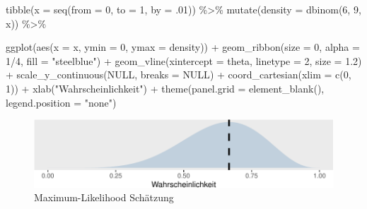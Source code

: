 \documentclass[]{tufte-handout}
\newenvironment{Shaded}{}{}
\newcommand{\AttributeTok}[1]{\textcolor[rgb]{0.49,0.56,0.16}{#1}}
\newcommand{\ConstantTok}[1]{\textcolor[rgb]{0.53,0.00,0.00}{#1}}
\newcommand{\DecValTok}[1]{\textcolor[rgb]{0.25,0.63,0.44}{#1}}
\newcommand{\FloatTok}[1]{\textcolor[rgb]{0.25,0.63,0.44}{#1}}
\newcommand{\FunctionTok}[1]{\textcolor[rgb]{0.02,0.16,0.49}{#1}}
\newcommand{\NormalTok}[1]{#1}
\newcommand{\SpecialCharTok}[1]{\textcolor[rgb]{0.25,0.44,0.63}{#1}}
\newcommand{\StringTok}[1]{\textcolor[rgb]{0.25,0.44,0.63}{#1}}
\begin{document}
\begin{Shaded}
\begin{Highlighting}[]
\FunctionTok{tibble}\NormalTok{(}\AttributeTok{x =} \FunctionTok{seq}\NormalTok{(}\AttributeTok{from =} \DecValTok{0}\NormalTok{, }\AttributeTok{to =} \DecValTok{1}\NormalTok{, }\AttributeTok{by =}\NormalTok{ .}\DecValTok{01}\NormalTok{)) }\SpecialCharTok{\%\textgreater{}\%} 
  \FunctionTok{mutate}\NormalTok{(}\AttributeTok{density =} \FunctionTok{dbinom}\NormalTok{(}\DecValTok{6}\NormalTok{, }\DecValTok{9}\NormalTok{, x)) }\SpecialCharTok{\%\textgreater{}\%} 
  
  \FunctionTok{ggplot}\NormalTok{(}\FunctionTok{aes}\NormalTok{(}\AttributeTok{x =}\NormalTok{ x, }\AttributeTok{ymin =} \DecValTok{0}\NormalTok{, }\AttributeTok{ymax =}\NormalTok{ density)) }\SpecialCharTok{+}
  \FunctionTok{geom\_ribbon}\NormalTok{(}\AttributeTok{size =} \DecValTok{0}\NormalTok{, }\AttributeTok{alpha =} \DecValTok{1}\SpecialCharTok{/}\DecValTok{4}\NormalTok{, }\AttributeTok{fill =} \StringTok{"steelblue"}\NormalTok{) }\SpecialCharTok{+}
  \FunctionTok{geom\_vline}\NormalTok{(}\AttributeTok{xintercept =}\NormalTok{ theta, }\AttributeTok{linetype =} \DecValTok{2}\NormalTok{, }\AttributeTok{size =} \FloatTok{1.2}\NormalTok{) }\SpecialCharTok{+}
  \FunctionTok{scale\_y\_continuous}\NormalTok{(}\ConstantTok{NULL}\NormalTok{, }\AttributeTok{breaks =} \ConstantTok{NULL}\NormalTok{) }\SpecialCharTok{+}
  \FunctionTok{coord\_cartesian}\NormalTok{(}\AttributeTok{xlim =} \FunctionTok{c}\NormalTok{(}\DecValTok{0}\NormalTok{, }\DecValTok{1}\NormalTok{)) }\SpecialCharTok{+}
  \FunctionTok{xlab}\NormalTok{(}\StringTok{"Wahrscheinlichkeit"}\NormalTok{) }\SpecialCharTok{+}
  \FunctionTok{theme}\NormalTok{(}\AttributeTok{panel.grid =} \FunctionTok{element\_blank}\NormalTok{(),}
        \AttributeTok{legend.position =} \StringTok{"none"}\NormalTok{)}
\end{Highlighting}
\end{Shaded}

\begin{figure}
\includegraphics{01-intro-bayesian-stats_files/figure-latex/maxlikbinom-1} \caption[Maximum-Likelihood Schätzung ]{Maximum-Likelihood Schätzung }\label{fig:maxlikbinom}
\end{figure}
\end{document}
